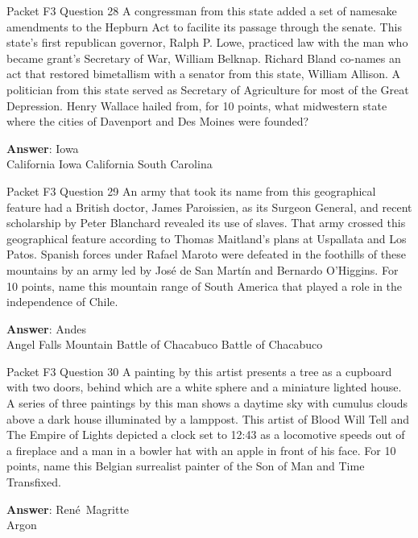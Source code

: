 \begin{frame}{Packet F3 Question 28}
A congressman from this state added a set   of namesake amendments to the Hepburn Act to facilite its passage through the senate. This state’s first republican governor, Ralph P. Lowe, practiced law with the man who became grant’s Secretary of War, William Belknap. Richard Bland co-names an act that restored bimetallism with a senator from this state, William Allison. A politician from this state served as Secretary of Agriculture for most of the Great Depression. Henry Wallace hailed from, for 10 points, what midwestern state where the cities of Davenport and Des Moines were founded?      

\textbf{Answer}: Iowa\\
 California
 Iowa
 California
 South Carolina
\end{frame}

\begin{frame}{Packet F3 Question 29}
An army that took its name from this geographical feature had a British doctor, James Paroissien, as its Surgeon General, and recent scholarship by Peter Blanchard revealed its use of slaves. That army crossed this geographical feature according   to Thomas Maitland’s   plans at Uspallata and Los Patos. Spanish forces under Rafael Maroto were defeated in the foothills of these mountains by an army led by José de San Martín and Bernardo O'Higgins.   For 10 points, name this mountain range of South America that played a role   in the independence of Chile.  

\textbf{Answer}: Andes\\
 Angel Falls
 Mountain
 Battle of Chacabuco
 Battle of Chacabuco
\end{frame}

\begin{frame}{Packet F3 Question 30}
A painting by this artist   presents a tree as a cupboard with two doors, behind which are a white sphere and a miniature lighted house. A series of three paintings by this man shows a daytime sky with cumulus clouds above a dark house illuminated by a lamppost. This artist of Blood Will Tell and The Empire of Lights depicted a clock set to 12:43   as a locomotive speeds out of a fireplace and a man in   a bowler hat with an   apple in front of his face. For 10 points, name this Belgian surrealist painter   of the Son of Man and Time Transfixed.

\textbf{Answer}: René\ Magritte\\
 Argon
\end{frame}

